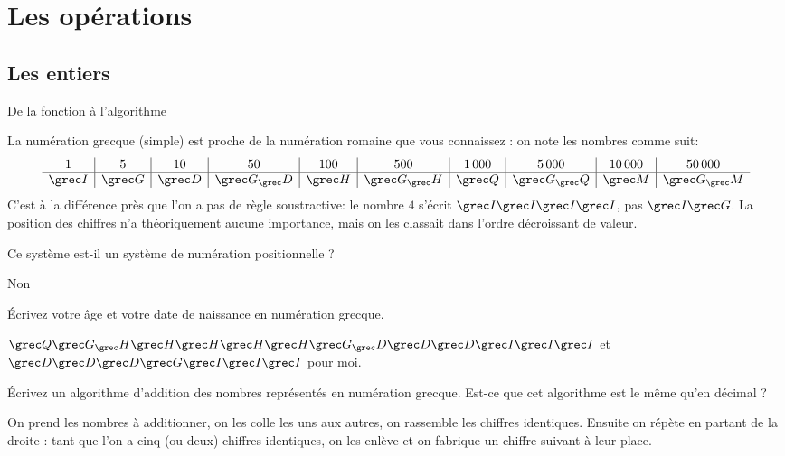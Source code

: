 \section{Les opérations}
\subsection{Les entiers}
\begin{exercice}
  \begin{exercicelet}{De la fonction à l'algorithme}

    La numération grecque (simple) est proche de la numération romaine que
    vous connaissez : on note les nombres comme suit:
    \[\begin{array}{c|c|c|c|c|c|c|c|c|c}
      1&5&10&50&100&500&1\,000&5\,000&10\,000&50\,000\\\hline
      \Iota&\Gamma&\Delta&\Gamma_\Delta&\Eta&\Gamma_\Eta&\Chi&\Gamma_\Chi&\Mu&\Gamma_\Mu
    \end{array}
    \] C'est à la différence près que l'on a pas de règle soustractive: le
    nombre $4$ s'écrit $\Iota\Iota\Iota\Iota$, pas $\Iota\Gamma$. La
    position des chiffres n'a théoriquement aucune importance, mais on les
    classait dans l'ordre décroissant de valeur.
    \begin{questions}
    \item Ce système est-il un système de numération positionnelle ?
      \begin{correction}Non\end{correction}
    \item Écrivez votre âge et votre date de naissance en numération
      grecque.
      \begin{xcorrection}$\Chi\Gamma_\Eta\Eta\Eta\Eta\Eta\Gamma_\Delta\Delta\Delta\Iota\Iota\Iota$
        et $\Delta\Delta\Delta\Gamma\Iota\Iota\Iota$ pour moi.\end{xcorrection}
    \item Écrivez un algorithme d'addition des nombres représentés en
      numération grecque. Est-ce que cet algorithme est le même qu'en décimal
      ?
      \begin{xcorrection}On prend les nombres à additionner, on les colle
        les uns aux autres, on rassemble les chiffres identiques. Ensuite on
        répète en partant de la droite : tant que l'on a cinq (ou deux) chiffres
        identiques, on les enlève et on fabrique un chiffre suivant à leur
        place.


\end{xcorrection}
\end{questions}
\end{exercicelet}
\end{exercice}
